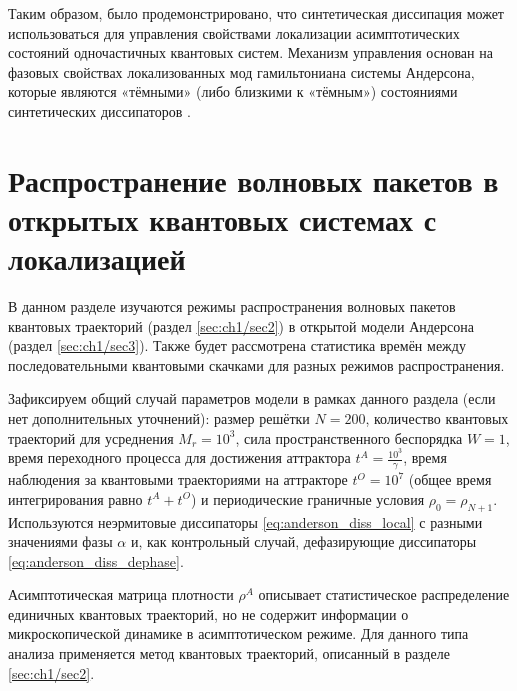 Таким образом, было продемонстрировано, что синтетическая диссипация может использоваться для управления свойствами локализации асимптотических состояний одночастичных квантовых систем. Механизм управления основан на фазовых свойствах локализованных мод гамильтониана системы Андерсона, которые являются  «тёмными» (либо близкими к «тёмным») состояниями синтетических диссипаторов \cite{Vershinina2017}.

\section{Распространение волновых пакетов в открытых квантовых системах с локализацией}\label{sec:ch1/prb_jump}
В данном разделе изучаются режимы распространения волновых пакетов квантовых траекторий \cite{Dalibard1992, Dum1992, Plenio1998} (раздел \cref{sec:ch1/sec2}) в открытой модели Андерсона (раздел \cref{sec:ch1/sec3}). Также будет рассмотрена статистика времён между последовательными квантовыми скачками для разных режимов распространения.

Зафиксируем общий случай параметров модели в рамках данного раздела (если нет дополнительных уточнений): размер решётки \(N=200\), количество квантовых траекторий для усреднения \(M_r=10^3\), сила пространственного беспорядка \(W=1\), время переходного процесса для достижения аттрактора \(t^A = \frac{10^3}{\gamma}\), время наблюдения за квантовыми траекториями на аттракторе \(t^O = 10^7\) (общее время интегрирования равно \(t^A + t^O\)) и периодические граничные условия \(\rho_0 = \rho_{N+1}\). Используются неэрмитовые диссипаторы \cref{eq:anderson_diss_local} с разными значениями фазы \(\alpha\) и, как контрольный случай, дефазирующие диссипаторы \cref{eq:anderson_diss_dephase}.

Асимптотическая матрица плотности \(\rho^A\) описывает статистическое распределение единичных квантовых траекторий, но не содержит информации о микроскопической динамике в асимптотическом режиме. Для данного типа анализа применяется метод квантовых траекторий, описанный в разделе \cref{sec:ch1/sec2}.

